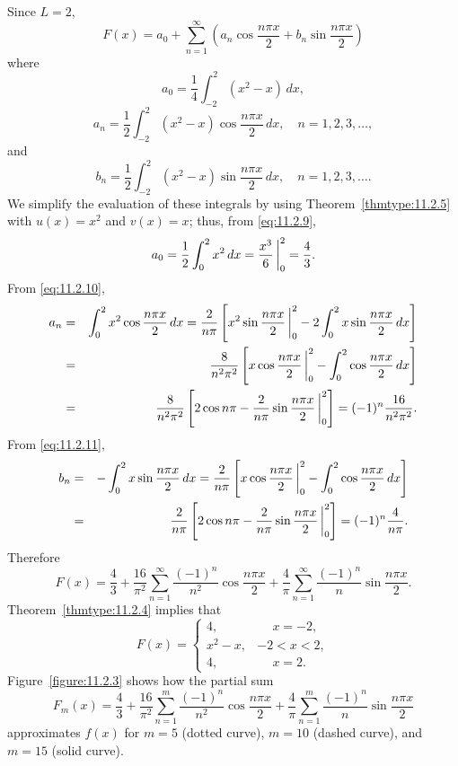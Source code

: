 \begin{examplesolution}
\solution Since $L=2$,
\[
  F(x)=a_{0}+\sum_{n=1}^{\infty}\left(a_{n}\cos\frac{n\pi x}{2}+b_{n}\sin\frac{n\pi x}{2}\right)
\]
where
\begin{equation}
  \label{eq:11.2.9}a_{0}=\frac{1}{4}\int_{-2}^{2}(x^{2}-x)\,dx,
\end{equation}
\begin{equation}
  \label{eq:11.2.10}a_{n}=\frac{1}{2}\int_{-2}^{2}(x^{2}-x)\cos\frac{n\pi x}{2}\,dx,\quad n=1,2,3,\dots,
\end{equation}
and
\begin{equation}
  \label{eq:11.2.11}b_{n}=\frac{1}{2}\int_{-2}^{2}(x^{2}-x)\sin\frac{n\pi x}{2}\,dx,\quad n=1,2,3,\dots.
\end{equation}
We simplify the evaluation of these integrals by using Theorem~\ref{thmtype:11.2.5} with
$u(x)=x^{2}$ and $v(x)=x$; thus, from \eqref{eq:11.2.9},
\[
  a_{0}=\frac{1}{2}\int_{0}^{2}x^{2}\,dx=\frac{x^{3}}{6}\,\bigg|_{0}^{2}=\frac{4}{3}.
\]
From \eqref{eq:11.2.10},
\begin{eqnarray*}
  a_{n} & = & \int_{0}^{2}x^{2}\cos\frac{n\pi x}{2}\,dx=\frac{2}{n\pi}\left[x^{2}\sin\frac{n\pi x}{2}\,\bigg|_{0}^{2}-2\int_{0}^{2}x\sin\frac{n\pi x}{2}\,dx\right] \\
        & = & \frac{8}{n^{2}\pi^{2}}\left[x\cos\frac{n\pi x}{2}\,\bigg|_{0}^{2}-\int_{0}^{2}\cos\frac{n\pi x}{2}\,dx\right]                                         \\
        & = & \frac{8}{n^{2}\pi^{2}}\left[2\cos n\pi-\frac{2}{n\pi}\sin\frac{n\pi x}{2}\,\bigg|_{0}^{2}\right]=(-1)^{n}\frac{16}{n^{2}\pi^{2}}.
\end{eqnarray*}
From \eqref{eq:11.2.11},
\begin{eqnarray*}
  b_{n} & = & -\int_{0}^{2}x\sin\frac{n\pi x}{2}\,dx=\frac{2}{n\pi}\left[x\cos\frac{n\pi x}{2}\,\bigg|_{0}^{2}-\int_{0}^{2}\cos\frac{n\pi x}{2}\,dx\right] \\
        & = & \frac{2}{n\pi}\left[2\cos n\pi-\frac{2}{n\pi}\sin\frac{n\pi x}{2}\,\bigg|_{0}^{2}\right]=(-1)^{n}\frac{4}{n\pi}.
\end{eqnarray*}
Therefore
\[
  F(x)=\frac{4}{3}+\frac{16}{\pi^{2}}\sum_{n=1}^{\infty}\frac{(-1)^{n}}{n^{2}}\cos\frac{n\pi x}{2}+\frac{4}{\pi}\sum_{n=1}^{\infty}\frac{(-1)^{n}}{n}\sin\frac{n\pi x}{2}.
\]
Theorem~\ref{thmtype:11.2.4} implies that
\[
  F(x)= \left\{
  \begin{array}{cl}
    4,       & \phantom{-}x=-2, \\
    x^{2}-x, & -2<x<2,          \\
    4,       & \phantom{-}x=2.
  \end{array}\right.
\]
Figure~\ref{figure:11.2.3} shows how the partial sum
\[
  F_{m}(x)=\frac{4}{3}+\frac{16}{\pi^{2}}\sum_{n=1}^{m}\frac{(-1)^{n}}{n^{2}}\cos\frac{n\pi x}{2}+\frac{4}{\pi}\sum_{n=1}^{m}\frac{(-1)^{n}}{n}\sin\frac{n\pi x}{2}
\]
approximates $f(x)$ for $m=5$ (dotted curve), $m=10$ (dashed curve), and $m=15$ (solid curve). \bbox


\end{examplesolution}
